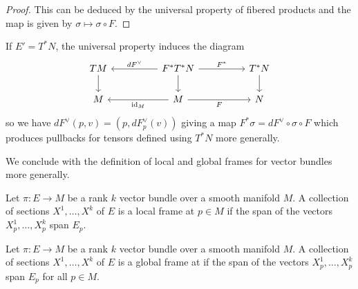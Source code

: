 \begin{proof}
    This can be deduced by the universal property of fibered products and the map is given by $\sigma\mapsto \sigma\circ F$. 
\end{proof}
\begin{example}
    If $E'=T^{*}N$, the universal property induces the diagram 
    $$%
    \begin{tikzcd}
        TM && {F^{*}T^{*}N} && {T^{*}N} \\
        M && M && N
        \arrow[from=1-1, to=2-1]
        \arrow["{dF^{\vee}}"', from=1-3, to=1-1]
        \arrow["{F^{*}}", from=1-3, to=1-5]
        \arrow[from=1-3, to=2-3]
        \arrow[from=1-5, to=2-5]
        \arrow["{\id_{M}}", from=2-3, to=2-1]
        \arrow["F"', from=2-3, to=2-5]
    \end{tikzcd}$$
    so we have $dF^{\vee}(p,v)=(p,dF_{p}^{\vee}(v))$ giving a map $F^{*}\sigma=dF^{\vee}\circ\sigma\circ F$ which produces pullbacks for tensors defined using $T^{*}N$ more generally. 
\end{example}
We conclude with the definition of local and global frames for vector bundles more generally. 
\begin{definition}\label{def: local frame vector bundle}
    Let $\pi:E\to M$ be a rank $k$ vector bundle over a smooth manifold $M$. A collection of sections $X^{1},\dots,X^{k}$ of $E$ is a local frame at $p\in M$ if the span of the vectors $X^{1}_{p},\dots,X^{k}_{p}$ span $E_{p}$. 
\end{definition}
\begin{definition}\label{def: global frame vector bundle}
    Let $\pi:E\to M$ be a rank $k$ vector bundle over a smooth manifold $M$. A collection of sections $X^{1},\dots,X^{k}$ of $E$ is a global frame at if the span of the vectors $X^{1}_{p},\dots,X^{k}_{p}$ span $E_{p}$ for all $p\in M$. 
\end{definition}